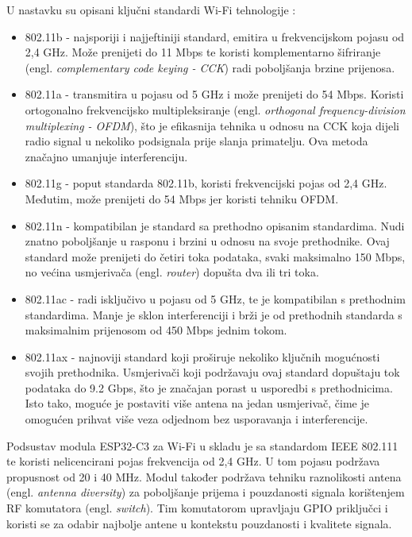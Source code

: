 U nastavku su opisani ključni standardi Wi-Fi tehnologije \cite{how_wifi_works}:
\begin{itemize}
	\item 802.11b - najsporiji i najjeftiniji standard, emitira u frekvencijskom pojasu od 2,4 GHz. Može prenijeti do 11 Mbps te koristi komplementarno šifriranje (engl. \textit{complementary code keying - CCK}) radi poboljšanja brzine prijenosa.
	\item 802.11a - transmitira u pojasu od 5 GHz i može prenijeti do 54 Mbps. Koristi ortogonalno frekvencijsko multipleksiranje (engl. \textit{orthogonal frequency-division multiplexing - OFDM}), što je efikasnija tehnika u odnosu na CCK koja dijeli radio signal u nekoliko podsignala prije slanja primatelju. Ova metoda značajno umanjuje interferenciju. 
	\item 802.11g - poput standarda 802.11b, koristi frekvencijski pojas od 2,4 GHz. Međutim, može prenijeti do 54 Mbps jer koristi tehniku OFDM.
	\item 802.11n - kompatibilan je standard sa prethodno opisanim standardima. Nudi znatno poboljšanje u rasponu i brzini u odnosu na svoje prethodnike. Ovaj standard može prenijeti do četiri toka podataka, svaki maksimalno 150 Mbps, no većina usmjerivača (engl. \textit{router}) dopušta dva ili tri toka.
	\item 802.11ac - radi isključivo u pojasu od 5 GHz, te je kompatibilan s prethodnim standardima. Manje je sklon interferenciji i brži je od prethodnih standarda s maksimalnim prijenosom od 450 Mbps jednim tokom. 
	\item 802.11ax - najnoviji standard koji proširuje nekoliko ključnih mogućnosti svojih prethodnika. Usmjerivači koji podržavaju ovaj standard dopuštaju tok podataka do 9.2 Gbps, što je značajan porast u usporedbi s prethodnicima. Isto tako, moguće je postaviti više antena na jedan usmjerivač, čime je omogućen prihvat više veza odjednom bez usporavanja i interferencije.
\end{itemize}

Podsustav modula ESP32-C3 za Wi-Fi u skladu je sa standardom IEEE 802.111 te koristi nelicencirani pojas frekvencija od 2,4 GHz. U tom pojasu podržava propusnost od 20 i 40 MHz. Modul također podržava tehniku raznolikosti antena (engl. \textit{antenna diversity}) za poboljšanje prijema i pouzdanosti signala korištenjem RF komutatora (engl. \textit{switch}). Tim komutatorom upravljaju GPIO priključci i koristi se za odabir najbolje antene u kontekstu pouzdanosti i kvalitete signala. \cite{esp_mini}

